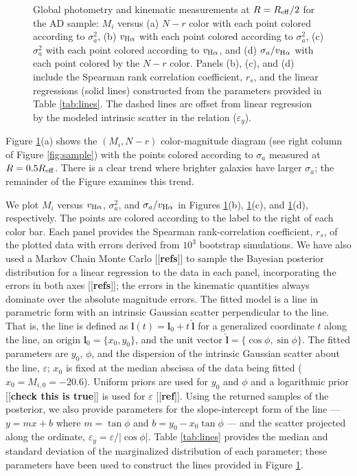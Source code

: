 \documentclass[apj,iop,revtex4,numberedappendix]{emulateapj}
\newcommand{\comment}[2][todo]{{\color{#1}[[{\bf #2}]]}}
\begin{document}
\begin{figure}
\begin{center}
%
\end{center}
%
\caption{
%
Global photometry and kinematic measurements at $R=R_{\rm eff}/2$ for
the AD sample: $M_i$ versus (a) $N-r$ color with each point colored
according to $\sigma_a^2$, (b) $v_{{\rm H}\alpha}$ with each point
colored according to $\sigma_a^2$, (c) $\sigma_a^2$ with each point
colored according to $v_{{\rm H}\alpha}$, and (d) $\sigma_a/v_{{\rm
H}\alpha}$ with each point colored by the $N-r$ color.  Panels (b), (c),
and (d) include the Spearman rank correlation coefficient, $r_s$, and
the linear regressions (solid lines) constructed from the parameters
provided in Table \ref{tab:lines}.  The dashed lines are offset from
linear regression by the modeled intrinsic scatter in the relation
($\varepsilon_y$).
%
}
%
\label{fig:correlation}
%
\end{figure}

Figure \ref{fig:correlation}(a) shows the $(M_i, N-r)$ color-magnitude
diagram (see right column of Figure \ref{fig:sample}) with the points
colored according to $\sigma_a$ measured at $R=0.5R_{\rm eff}$.  There
is a clear trend where brighter galaxies have larger $\sigma_a$; the
remainder of the Figure examines this trend.

We plot $M_i$ versus $v_{{\rm H}\alpha}$, $\sigma_a^2$, and
$\sigma_a/v_{{\rm H}\alpha}$ in Figures \ref{fig:correlation}(b),
\ref{fig:correlation}(c), and \ref{fig:correlation}(d), respectively.
The points are colored according to the label to the right of each color
bar.  Each panel provides the Spearman rank-correlation coefficient,
$r_s$, of the plotted data with errors derived from $10^3$ bootstrap
simulations.  We have also used a Markov Chain Monte Carlo
\comment{refs} to sample the Bayesian posterior distribution for a
linear regression to the data in each panel, incorporating the errors in
both axes \comment{refs}; the errors in the kinematic quantities always
dominate over the absolute magnitude errors.  The fitted model is a line
in parametric form with an intrinsic Gaussian scatter perpendicular to
the line.  That is, the line is defined as $\mathbf{l}(t) = \mathbf{l}_0
+ t\ \hat{\mathbf{l}}$ for a generalized coordinate $t$ along the line,
an origin $\mathbf{l}_0 = \{x_0, y_0\}$, and the unit vector
$\hat{\mathbf{l}} = \{\cos\phi, \sin\phi\}$.  The fitted parameters are
$y_0$, $\phi$, and the dispersion of the intrinsic Gaussian scatter
about the line, $\varepsilon$; $x_0$ is fixed at the median abscissa of
the data being fitted ($x_0 = M_{i,0} = -20.6$).  Uniform priors are
used for $y_0$ and $\phi$ and a logarithmic prior \comment{check this is
true} is used for $\varepsilon$ \comment{ref}.  Using the returned
samples of the posterior, we also provide parameters for the
slope-intercept form of the line --- $y = mx + b$ where $m = \tan\phi$
and $b = y_0 - x_0 \tan\phi$ --- and the scatter projected along the
ordinate, $\varepsilon_y = \varepsilon/|\cos\phi$|.  Table
\ref{tab:lines} provides the median and standard deviation of the
marginalized distribution of each parameter; these parameters have been
used to construct the lines provided in Figure \ref{fig:correlation}.
\end{document}
